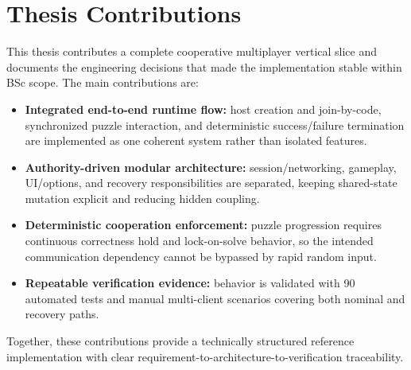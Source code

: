\section{Thesis Contributions}
This thesis contributes a complete cooperative multiplayer vertical slice and documents the engineering decisions that made the implementation stable within BSc scope. The main contributions are:

\begin{itemize}
\item \textbf{Integrated end-to-end runtime flow:} host creation and join-by-code, synchronized puzzle interaction, and deterministic success/failure termination are implemented as one coherent system rather than isolated features.
\item \textbf{Authority-driven modular architecture:} session/networking, gameplay, UI/options, and recovery responsibilities are separated, keeping shared-state mutation explicit and reducing hidden coupling.
\item \textbf{Deterministic cooperation enforcement:} puzzle progression requires continuous correctness hold and lock-on-solve behavior, so the intended communication dependency cannot be bypassed by rapid random input.
\item \textbf{Repeatable verification evidence:} behavior is validated with 90 automated tests and manual multi-client scenarios covering both nominal and recovery paths.
\end{itemize}

Together, these contributions provide a technically structured reference implementation with clear requirement-to-architecture-to-verification traceability.
